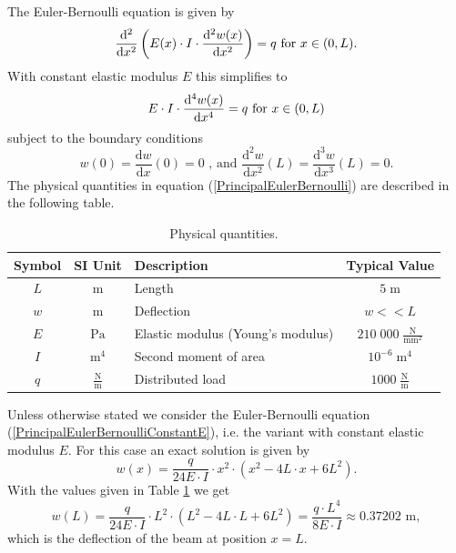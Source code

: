 \documentclass[a4paper,11pt]{article}
\def\Meter{\mathrm{m}}
\def\Pascal{\mathrm{Pa}}
\def\NewtonVsSquareMillimeter{\frac{\mathrm{N}}{\mathrm{mm}^2}}
\def\NewtonVsMeter{\frac{\mathrm{N}}{\mathrm{m}}}
\begin{document}
The Euler-Bernoulli equation is given by
\begin{equation} \label{PrincipalEulerBernoulli}
\frac{\mathrm{d}^2}{\mathrm{d}x^2}\left( E (x) \cdot I \cdot \frac{\mathrm{d}^2 w(x)}{\mathrm{d}x^2} \right) = q \text{ for } x \in (0,L) .\\
\end{equation}
With constant elastic modulus $E$ this simplifies to
\begin{equation} \label{PrincipalEulerBernoulliConstantE}
E\cdot I \cdot \frac{\mathrm{d}^4 w(x)}{\mathrm{d}x^4} = q \text{ for } x \in (0,L)\\
\end{equation}
subject to the boundary conditions
\begin{equation} \label{PrincipalBoundaryConditions}
w( 0) = \frac{\mathrm{d} w}{\mathrm{d}x}(0) = 0 \text{ , and } \frac{\mathrm{d}^2 w}{\mathrm{d}x^2}(L) = \frac{\mathrm{d}^3 w}{\mathrm{d}x^3}(L) = 0.
\end{equation}
The physical quantities in equation (\ref{PrincipalEulerBernoulli}) are described in the following table.

\begin{table}[h!] 
\centering
\begin{tabular}{cclc}
\toprule
\textbf{Symbol} & \textbf{SI Unit} & \textbf{Description}& \textbf{Typical Value}\\
\midrule
$L$ & $\Meter$ & Length & $5\; \Meter$\\
$w$ & $\Meter$ & Deflection &  $w<< L $\\
$E$ & $\Pascal$ & Elastic modulus (Young's modulus) & $210\;000\; \NewtonVsSquareMillimeter$\\
$I$ &$ \Meter^4$ & Second moment of area & $10^{-6}\;\Meter^4$ \\
$q$ &$ \NewtonVsMeter $ & Distributed load & $1000 \;\NewtonVsMeter $ \\
\bottomrule
\end{tabular}
\caption{Physical quantities.}
\label{TableTypicalValues}
\end{table}

Unless otherwise stated we consider the Euler-Bernoulli equation (\ref{PrincipalEulerBernoulliConstantE}), i.e. the variant with constant elastic modulus $E$. For this case an exact solution is given by
\begin{equation*}
w(x) = \frac{q}{24 E\cdot I }\cdot x^2 \cdot \left( x^2 -4L\cdot x + 6L^2\right) .
\end{equation*}
With the values given in Table \ref{TableTypicalValues} we get
\begin{equation} \label{MaximalDeflection}
w( L) = \frac{q}{24 E\cdot I }\cdot L^2 \cdot \left( L^2 -4L\cdot L + 6L^2\right) = \frac{q\cdot L^4}{8 E\cdot I } \approx 0.37202 \text{ m},
\end{equation}
which is the deflection of the beam at position $x = L$.
\end{document}
